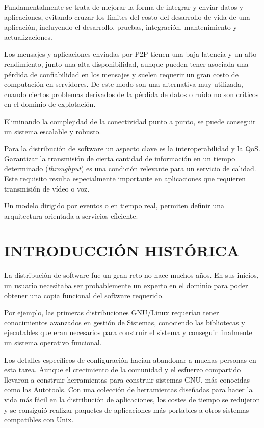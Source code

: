 Fundamentalmente se trata de mejorar la forma de integrar y enviar datos y
aplicaciones, evitando cruzar los límites del costo del desarrollo de vida de
una aplicación, incluyendo el desarrollo, pruebas, integración, mantenimiento y
actualizaciones.

Los mensajes y aplicaciones enviadas por \acs{P2P} tienen una baja latencia y un
alto rendimiento, junto una alta disponibilidad, aunque pueden tener asociada
una pérdida de confiabilidad en los mensajes y suelen requerir un gran costo
de computación en servidores.
De este modo son una alternativa muy utilizada, cuando ciertos problemas
derivados de la pérdida de datos o ruido no son críticos en el dominio de
explotación.

Eliminando la complejidad de la conectividad punto a punto, se puede conseguir
un sistema escalable y robusto.

Para la distribución de software un aspecto clave es la interoperabilidad y la
\acf{QoS}. Garantizar la transmisión de cierta cantidad de
información en un tiempo determinado (\emph{throughput}) es una condición
relevante para un servicio de calidad. Este requisito resulta especialmente
importante en aplicaciones que requieren transmisión de vídeo o voz.

Un modelo dirigido por eventos o en tiempo real, permiten definir una
arquitectura orientada a servicios eficiente.

\newpage

\section{\uppercase{Introducción histórica}}

La distribución de software fue un gran reto no hace muchos años. En sus
inicios, un usuario necesitaba ser probablemente un experto en el
dominio\cite{ReJ12} para poder obtener una copia funcional del software 
requerido.

Por ejemplo, las primeras distribuciones GNU/Linux requerían tener conocimientos
avanzados en gestión de Sistemas, conociendo las bibliotecas y ejecutables
que eran necesarios para construir el sistema y conseguir finalmente un sistema
operativo funcional.

Los detalles específicos de configuración hacían
abandonar a muchas personas en esta tarea. Aunque el crecimiento de la comunidad
y el esfuerzo compartido llevaron a construir herramientas para construir sistemas
\acs{GNU}\label{acro:GNU}, más conocidas como las Autotools. Con una colección
de herramientas diseñadas para hacer la vida más fácil en la distribución de 
aplicaciones, los costes de tiempo se redujeron y se consiguió realizar
paquetes de aplicaciones más portables a otros sistemas compatibles con Unix.

